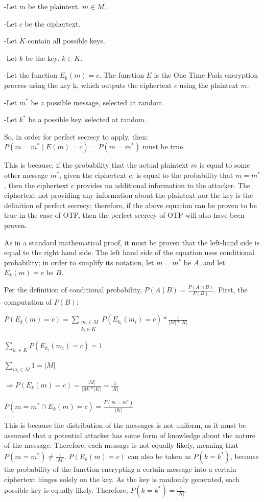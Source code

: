 \documentclass[12pt]{report}
\begin{document}
-Let $m$ be the plaintext. $m \in M$.

-Let $c$ be the ciphertext.

-Let $K$ contain all possible keys.

-Let $k$ be the key. $k \in K$.

-Let the function ${E_k}(m)=c$. The function $E$ is the One Time Pads encryption process using the key k, which outputs the ciphertext $c$ using the plaintext $m$.

-Let $m^{*}$ be a possible message, selected at random.

-Let $k^{*}$ be a possible key, selected at random.

So, in order for perfect secrecy to apply, then:
$P( m=m^{*} \mid E(m)=c ) = P( m=m^{*} )$
must be true.

This is because, if the probability that the actual plaintext $m$ is equal to some other message $m^{*}$, given the ciphertext $c$, is equal to the probability that $m=m^{*}$, then the ciphertext $c$ provides no additional information to the attacker. The ciphertext not providing any information about the plaintext nor the key is the definition of perfect secrecy; therefore, if the above equation can be proven to be true in the case of OTP, then the perfect secrecy of OTP will also have been proven.

As in a standard mathematical proof, it must be proven that the left-hand side is equal to the right hand side. The left hand side of the equation uses conditional probability; in order to simplify its notation, let $m=m^{*}$ be $A$, and let ${E_k}(m)=c$ be $B$.

Per the definition of conditional probability, $P(A \mid B) = \frac{P(A \cap B)}{P(B)}$. First, the computation of $P(B)$:

$P({E_k}(m)=c) = \sum\limits_{\substack{m_i \in M \\ k_i \in K}}
P(E_{k_i}(m_i)=c) 
* \frac{1}{\lvert M \rvert*\lvert K \rvert}$

$\sum\limits_{k_i \in K}
P(E_{k_i}(m_i)=c)
=1$

$\sum\limits_{m_i \in M} 1
= \lvert M \rvert$

$\Rightarrow P({E_k}(m)=c) = \frac{\lvert M \rvert}{\lvert M \rvert*\lvert K \rvert} = \frac{1}{\lvert K \rvert}$

$P(m=m^{*} \cap {E_k}(m)=c) = \frac{P(m=m^{*})}{\lvert K \rvert}$

This is because the distribution of the messages is not uniform, as it must be assumed that a potential attacker has some form of knowledge about the nature of the message. Therefore, each message is not equally likely, meaning that 
$P(m=m^{*}) \neq \frac{1}{\lvert M \rvert}$. $P({E_k}(m)=c)$ can also be taken as $P(k=k^{*})$, because the probability of the function encrypting a certain message into a certain ciphertext hinges solely on the key. As the key is randomly generated, each possible key is equally likely. Therefore, 
$P(k=k^{*}) = \frac{1}{\lvert K \rvert} $.
\end{document}
